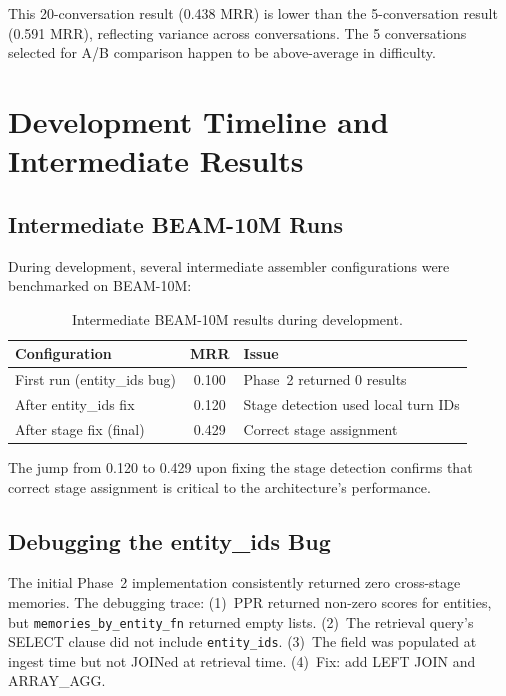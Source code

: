 \documentclass[11pt]{article}
\begin{document}
This 20-conversation result (0.438 MRR) is lower than the
5-conversation result (0.591 MRR), reflecting variance across
conversations.  The 5 conversations selected for A/B comparison
happen to be above-average in difficulty.

\section{Development Timeline and Intermediate Results}
\label{app:dev-timeline}

\subsection{Intermediate BEAM-10M Runs}

During development, several intermediate assembler configurations
were benchmarked on BEAM-10M:

\begin{table}[h]
\centering
\caption{Intermediate BEAM-10M results during development.}
\label{tab:intermediate}
\begin{tabular}{lcp{5cm}}
\toprule
Configuration & MRR & Issue \\
\midrule
First run (entity\_ids bug) & 0.100 & Phase~2 returned 0 results \\
After entity\_ids fix & 0.120 & Stage detection used local turn IDs \\
After stage fix (final) & 0.429 & Correct stage assignment \\
\bottomrule
\end{tabular}
\end{table}

The jump from 0.120 to 0.429 upon fixing the stage detection confirms
that correct stage assignment is critical to the architecture's
performance.

\subsection{Debugging the entity\_ids Bug}

The initial Phase~2 implementation consistently returned zero
cross-stage memories.  The debugging trace: (1)~PPR returned non-zero
scores for entities, but \texttt{memories\_by\_entity\_fn} returned
empty lists.  (2)~The retrieval query's SELECT clause did not include
\texttt{entity\_ids}.  (3)~The field was populated at ingest time but
not JOINed at retrieval time.  (4)~Fix: add LEFT JOIN and
ARRAY\_AGG.
\end{document}
